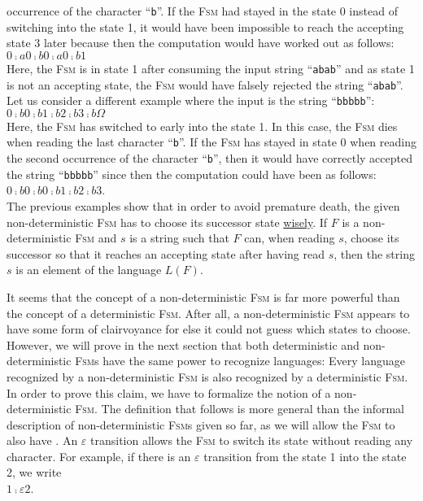 occurrence of the character ``\texttt{b}''.  If the \textsc{Fsm} had stayed in the state 0 instead
of switching into the state 1, it would have been impossible to reach the accepting state 3 later
because then the computation would have worked out as follows:
\\[0.2cm]
\hspace*{1.3cm}
$0 \comp{a} 0 \comp{b} 0 \comp{a} 0 \comp{b} 1$
\\[0.2cm] 
Here, the \textsc{Fsm} is in state 1 after consuming the input string ``\texttt{abab}'' and as state
1 is not an accepting state, the \textsc{Fsm} would have falsely rejected the string ``\texttt{abab}''.
Let us consider a different example where the input is the string ``\texttt{bbbbb}'':
\\[0.2cm]
\hspace*{1.3cm}
$0 \comp{b} 0 \comp{b} 1 \comp{b} 2 \comp{b} 3 \comp{b} \Omega$
\\[0.2cm]
Here, the \textsc{Fsm} has switched to early into the state 1.  In this case, the \textsc{Fsm} dies
when reading the last character ``\texttt{b}''.  If the \textsc{Fsm} has stayed in state 0 when reading the second
occurrence of the character ``\texttt{b}'', then it would have correctly accepted the string
``\texttt{bbbbb}'' since then the computation could have been as follows:
\\[0.2cm]
\hspace*{1.3cm}
$0 \comp{b} 0 \comp{b} 0 \comp{b} 1 \comp{b} 2 \comp{b} 3$.
\\[0.2cm]
The previous examples show that in order to avoid premature death, the given non-deterministic \textsc{Fsm} has
to choose its successor state
\href{http://mygeekwisdom.com/2013/06/15/he-chose-poorly-and-you-have-chosen-wisely/}{wisely}.  
If $F$ is a non-deterministic \textsc{Fsm} and $s$ is a string such that $F$ can, when reading $s$,
choose its successor so that it reaches an accepting state after having read $s$, then the string
$s$ is an element of the language $L(F)$.

It seems that the concept of a non-deterministic \textsc{Fsm} is far more powerful than the 
concept of a deterministic \textsc{Fsm}.  After all, a non-deterministic \textsc{Fsm} appears to
have some form of clairvoyance for else it could not guess which states to choose.  However, we will
prove in the 
next section that both deterministic and non-deterministic \textsc{Fsm}s have the same power to
recognize languages:  Every language recognized by a non-deterministic \textsc{Fsm} is also
recognized by a deterministic \textsc{Fsm}.  In order to prove this claim, we have to
formalize the notion of a non-deterministic \textsc{Fsm}.  The definition that follows is more
general than the informal description of non-deterministic \textsc{Fsm}s given so far, as we will
allow the \textsc{Fsm} to also have  .  An $\varepsilon$ transition
allows the \textsc{Fsm} to switch its state without reading any character.  For example, if there is
an $\varepsilon$ transition from the state 1 into the state 2, we write
\\[0.2cm]
\hspace*{1.3cm}
$1 \comp{\varepsilon} 2$.


